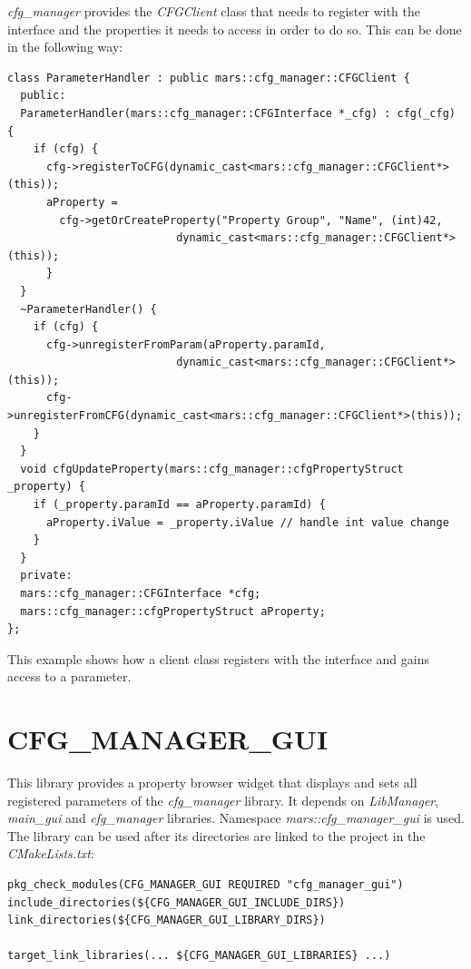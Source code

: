 \documentclass{article}
\begin{document}
\emph{cfg\_manager} provides the \emph{CFGClient} class that needs to register with the interface and the properties it needs to access in order to do so. This can be done in the following way:

\begin{lstlisting}
class ParameterHandler : public mars::cfg_manager::CFGClient {
  public:
  ParameterHandler(mars::cfg_manager::CFGInterface *_cfg) : cfg(_cfg) {
    if (cfg) {
      cfg->registerToCFG(dynamic_cast<mars::cfg_manager::CFGClient*>(this));
      aProperty = 
        cfg->getOrCreateProperty("Property Group", "Name", (int)42,
                          dynamic_cast<mars::cfg_manager::CFGClient*>(this));
      }
  }
  ~ParameterHandler() {
    if (cfg) {
      cfg->unregisterFromParam(aProperty.paramId,
                          dynamic_cast<mars::cfg_manager::CFGClient*>(this));
      cfg->unregisterFromCFG(dynamic_cast<mars::cfg_manager::CFGClient*>(this));
    }
  }
  void cfgUpdateProperty(mars::cfg_manager::cfgPropertyStruct _property) {
    if (_property.paramId == aProperty.paramId) {
      aProperty.iValue = _property.iValue // handle int value change
    }
  }
  private:
  mars::cfg_manager::CFGInterface *cfg;
  mars::cfg_manager::cfgPropertyStruct aProperty;
};

\end{lstlisting}

This example shows how a client class registers with the interface and gains access to a parameter.  


\section{CFG\_MANAGER\_GUI}

This library provides a property browser widget that displays and sets all registered parameters of the 
\emph{cfg\_manager} library. It depends on \emph{LibManager}, \emph{main\_gui} and \emph{cfg\_manager} libraries. 
Namespace \emph{mars::cfg\_manager\_gui} is used.\\

The library can be used after its directories are linked to the project in the \emph{CMakeLists.txt}:

\begin{lstlisting}
pkg_check_modules(CFG_MANAGER_GUI REQUIRED "cfg_manager_gui")
include_directories(${CFG_MANAGER_GUI_INCLUDE_DIRS})
link_directories(${CFG_MANAGER_GUI_LIBRARY_DIRS})

target_link_libraries(... ${CFG_MANAGER_GUI_LIBRARIES} ...)
\end{lstlisting}
\end{document}
